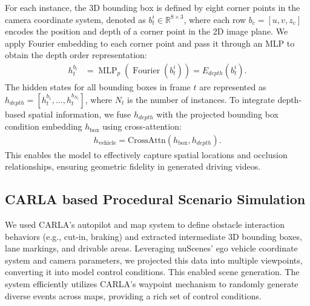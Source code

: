 For each instance, the 3D bounding box is defined by eight corner points in the camera coordinate system, denoted as $ b^i_t \in \mathbb{R}^{8 \times 3} $, where each row $ b_c = [u, v, z_c] $ encodes the position and depth of a corner point in the 2D image plane. We apply Fourier embedding to each corner point and pass it through an MLP to obtain the depth order representation:  
\begin{align}
    h^{b_i}_t &= \operatorname{MLP}_p(\operatorname{Fourier}(b^i_t)) = E_{depth}(b^i_t).
    \label{equ:box_pos}
\end{align}
The hidden states for all bounding boxes in frame $ t $ are represented as $ h_{depth} = [h^{b_1}_t, \dots, h^{b_{N_{t}}}_t] $, where $ N_{t} $ is the number of instances. To integrate depth-based spatial information, we fuse $ h_{depth} $ with the projected bounding box condition embedding $ h_{\text{box}} $ using cross-attention:  
\begin{align}
    h_{\text{vehicle}} =  \text{CrossAttn}(h_{\text{box}}, h_{depth}).
\end{align}
This enables the model to effectively capture spatial locations and occlusion relationships, ensuring geometric fidelity in generated driving videos.


\subsection{CARLA based Procedural Scenario Simulation} 
\label{section:carla}
We used CARLA's autopilot and map system to define obstacle interaction behaviors (e.g., cut-in, braking) and extracted intermediate 3D bounding boxes, lane markings, and drivable areas. Leveraging nuScenes' ego vehicle coordinate system and camera parameters, we projected this data into multiple viewpoints, converting it into model control conditions. This enabled scene generation. The system efficiently utilizes CARLA's waypoint mechanism to randomly generate diverse events across maps, providing a rich set of control conditions.